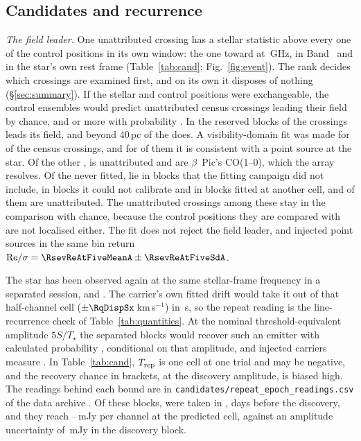 \subsection{Candidates and recurrence}
\label{sec:etacrv}

\label{sec:vistest}%
\emph{The field leader.} One unattributed crossing has a stellar statistic
above every one of the \NCtrl{} control positions in its own window: the one toward
\EvAStar{} at \RqFreqSx\,GHz, in Band~\EvABand{} and in the star's own rest
frame (Table~\ref{tab:cand}; Fig.~\ref{fig:event}). The rank decides which
crossings are examined first, and on its own it disposes of nothing
(\S\ref{sec:summary}). If the stellar and control positions were
exchangeable, the control ensembles would predict \RkCondExp{} unattributed
census crossings leading their field by chance, and \RkCondNObsWord{} or more
with probability \RkCondProb. In the reserved blocks \RkHoLeadWord{} of the \RkHoNWord{}
crossings leads its field, and beyond 40\,pc \RkOosLeadWord{} of the \RkOosNWord{} does. A
visibility-domain fit was made for \CsNVisFit{} of the \CsNCross{} census
crossings, and for \CsNVisLocal{} of them it is consistent with a point source
at the star. Of the other \JqNNotLoc, \JqNNotLocUnWord{} is unattributed and
\JqNNotLocCoWord{} are $\beta$~Pic's CO(1--0), which the array resolves.
Of the \JqNUnfit{} never fitted, \JqNUnfitLateWord{} lie in blocks that the
fitting campaign did not include, \JqNUnfitNocalWord{} in blocks it could not
calibrate and \JqNUnfitOtherWord{} in blocks fitted at another cell, and
\JqNUnfitUn{} of them are unattributed. The unattributed crossings among
these stay in the comparison with chance, because the control positions
they are compared with are not localised either. The fit
does not reject the field leader, and injected point sources in
the same bin return ${\rm Re}/\sigma=\RsevReAtFiveMeanA\pm\RsevReAtFiveSdA$.

The star has been observed again at the same stellar-frame frequency in a
separated session, and \RcSxSepClause. The carrier's own fitted drift would
take it out of that half-channel cell ($\pm\RqDispSx$\,km\,s$^{-1}$) in
\ZtSxLeaveSec\,s, so the repeat reading is the line-recurrence check of
Table~\ref{tab:quantities}. At the nominal threshold-equivalent amplitude
$5S/T_\star$ the separated blocks would recover such an emitter with
calculated probability \RcSxPowerTrig, conditional on that amplitude, and
injected carriers measure \HjMeasSx. In Table~\ref{tab:cand}, $T_{\rm rep}$ is one cell
at one trial and may be negative, and the recovery chance in brackets, at the
discovery amplitude, is biased high. The readings behind each bound are in
\texttt{candidates/repeat\_epoch\_readings.csv} of the data archive
\citep{SIdeposit}. Of these blocks, \RcSxNDeepWord{} were taken in
\RcSxDeepYears, \RcSxDeepSepD{} days before the discovery, and they reach
\RcSxDeepSigLo--\RcSxDeepSigHi\,mJy per channel at the predicted cell,
against an amplitude uncertainty of \RcSxFluxErr\,mJy in the discovery
block\RcSxLimClause.

